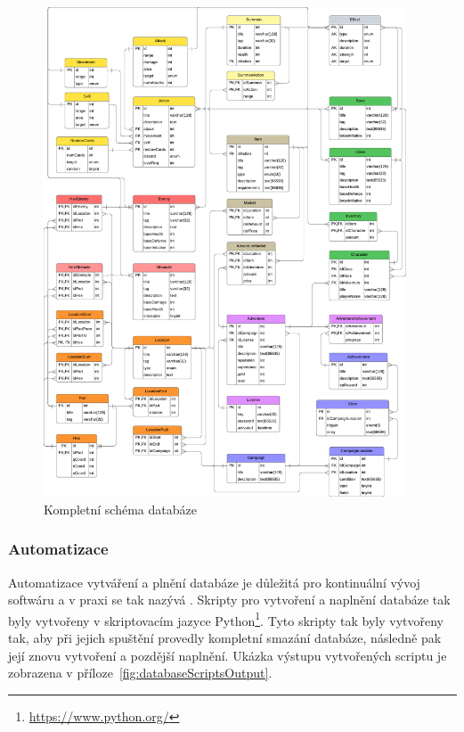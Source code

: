 \begin{figure}[!H]
    \centering
    \includegraphics[width=0.96\textwidth]{../../shared/diagrams/dbScheme}
    \caption{Kompletní schéma databáze}
    \label{fig:db_scheme}
\end{figure}

\subsubsection*{Automatizace}
\label{subsubsec:implementation-technologies-database-automatization}
Automatizace vytváření a plnění databáze je důležitá pro kontinuální vývoj softwáru a v praxi se tak nazývá . Skripty pro vytvoření a naplnění databáze tak byly vytvořeny v skriptovacím jazyce Python\footnote{\href{https://www.python.org/}{https://www.python.org/}}. Tyto skripty tak byly vytvořeny tak, aby při jejich spuštění provedly kompletní smazání databáze, následně pak její znovu vytvoření a pozdější naplnění. Ukázka výstupu vytvořených scriptu je zobrazena v příloze~\ref{fig:databaseScriptsOutput}.

